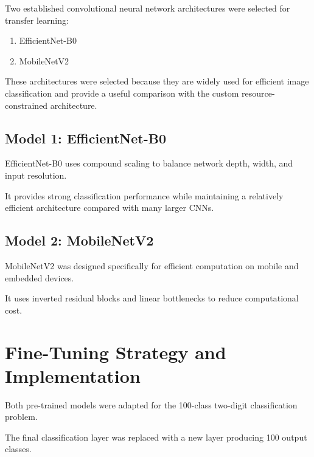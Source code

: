 \documentclass[12pt,a4paper]{report}
\begin{document}
Two established convolutional neural network architectures were
selected for transfer learning:

\begin{enumerate}
    \item EfficientNet-B0
    \item MobileNetV2
\end{enumerate}

These architectures were selected because they are widely used
for efficient image classification and provide a useful
comparison with the custom resource-constrained architecture.

\subsection{Model 1: EfficientNet-B0}

EfficientNet-B0 uses compound scaling to balance network depth,
width, and input resolution.

It provides strong classification performance while maintaining
a relatively efficient architecture compared with many larger
CNNs.

\subsection{Model 2: MobileNetV2}

MobileNetV2 was designed specifically for efficient computation
on mobile and embedded devices.

It uses inverted residual blocks and linear bottlenecks to reduce
computational cost.

\section{Fine-Tuning Strategy and Implementation}

Both pre-trained models were adapted for the 100-class
two-digit classification problem.

The final classification layer was replaced with a new layer
producing 100 output classes.

\end{document}
